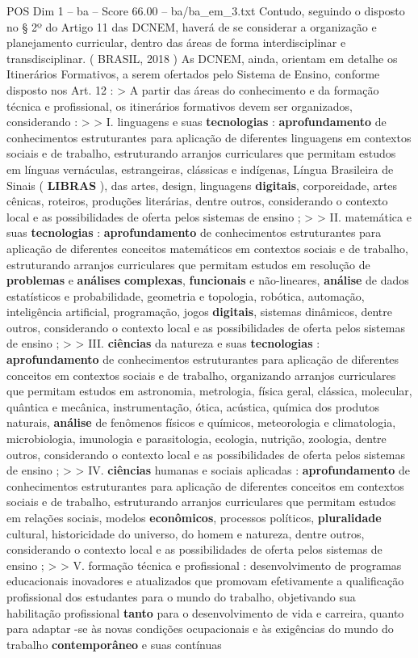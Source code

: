 \begin{textsample}{POS Dim 1 – ba – Score 66.00 – ba/ba\_em\_3.txt}
Contudo, seguindo o disposto no § 2º do Artigo 11 das DCNEM, haverá de se considerar a organização e planejamento curricular, dentro das áreas de forma interdisciplinar e transdisciplinar. ( BRASIL, 2018 ) As DCNEM, ainda, orientam em detalhe os Itinerários Formativos, a serem ofertados pelo Sistema de Ensino, conforme disposto nos Art. 12 : > A partir das áreas do conhecimento e da formação técnica e profissional, os itinerários formativos devem ser organizados, considerando : > > I. linguagens e suas \textbf{tecnologias} : \textbf{aprofundamento} de conhecimentos estruturantes para aplicação de diferentes linguagens em contextos sociais e de trabalho, estruturando arranjos curriculares que permitam estudos em línguas vernáculas, estrangeiras, clássicas e indígenas, Língua Brasileira de Sinais ( \textbf{LIBRAS} ), das artes, design, linguagens \textbf{digitais}, corporeidade, artes cênicas, roteiros, produções literárias, dentre outros, considerando o contexto local e as possibilidades de oferta pelos sistemas de ensino ; > > II. matemática e suas \textbf{tecnologias} : \textbf{aprofundamento} de conhecimentos estruturantes para aplicação de diferentes conceitos matemáticos em contextos sociais e de trabalho, estruturando arranjos curriculares que permitam estudos em resolução de \textbf{problemas} e \textbf{análises} \textbf{complexas}, \textbf{funcionais} e não-lineares, \textbf{análise} de dados estatísticos e probabilidade, geometria e topologia, robótica, automação, inteligência artificial, programação, jogos \textbf{digitais}, sistemas dinâmicos, dentre outros, considerando o contexto local e as possibilidades de oferta pelos sistemas de ensino ; > > III. \textbf{ciências} da natureza e suas \textbf{tecnologias} : \textbf{aprofundamento} de conhecimentos estruturantes para aplicação de diferentes conceitos em contextos sociais e de trabalho, organizando arranjos curriculares que permitam estudos em astronomia, metrologia, física geral, clássica, molecular, quântica e mecânica, instrumentação, ótica, acústica, química dos produtos naturais, \textbf{análise} de fenômenos físicos e químicos, meteorologia e climatologia, microbiologia, imunologia e parasitologia, ecologia, nutrição, zoologia, dentre outros, considerando o contexto local e as possibilidades de oferta pelos sistemas de ensino ; > > IV. \textbf{ciências} humanas e sociais aplicadas : \textbf{aprofundamento} de conhecimentos estruturantes para aplicação de diferentes conceitos em contextos sociais e de trabalho, estruturando arranjos curriculares que permitam estudos em relações sociais, modelos \textbf{econômicos}, processos políticos, \textbf{pluralidade} cultural, historicidade do universo, do homem e natureza, dentre outros, considerando o contexto local e as possibilidades de oferta pelos sistemas de ensino ; > > V. formação técnica e profissional : desenvolvimento de programas educacionais inovadores e atualizados que promovam efetivamente a qualificação profissional dos estudantes para o mundo do trabalho, objetivando sua habilitação profissional \textbf{tanto} para o desenvolvimento de vida e carreira, quanto para adaptar -se às novas condições ocupacionais e às exigências do mundo do trabalho \textbf{contemporâneo} e suas contínuas 
\end{textsample}
